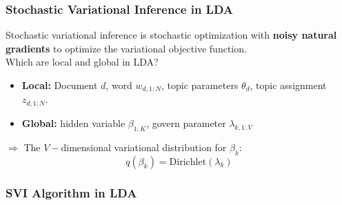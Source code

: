 \documentclass[10pt]{beamer}
\begin{document}
\begin{frame}
	\frametitle{Stochastic Variational Inference in LDA}
	Stochastic variational inference is stochastic optimization with \textbf{noisy natural gradients} to optimize the variational objective function. \\
	Which are local and global in LDA?
	\begin{itemize}
		\item \textbf{Local:} Document $d$, word $w_{d,1:N}$, topic parameters $\theta_d$, topic assignment $z_{d,1:N}$.
		\item \textbf{Global:} hidden variable $\beta_{1:K}$, govern parameter $\lambda_{k,1:V}$
	\end{itemize}
	$\Rightarrow$ The $V -$dimensional variational distribution for $\beta_k$:
	$$q(\beta_k)=\text{Dirichlet}(\lambda_k)$$
\end{frame}

\begin{frame}
	\frametitle{SVI Algorithm in LDA}
	\begin{table}
	\end{table} 	  	
\end{frame}
\end{document}
